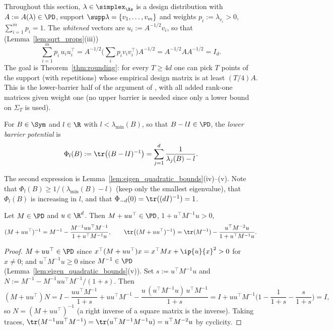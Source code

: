 Throughout this section, $\lambda \in \simplex_{\Xs}$ is a design distribution with
$A := A(\lambda) \in \PD$, support $\supp\lambda = \{v_1,\dots,v_m\}$ and weights
$p_i := \lambda_{v_i} > 0$, $\sum_{i=1}^m p_i = 1$. The \emph{whitened} vectors are
$u_i := A^{-1/2}v_i$, so that (Lemma~\ref{lem:sqrt_props}(iii))
\[
  \sum_{i=1}^m p_i\,u_iu_i^\top = A^{-1/2}\Big(\sum_i p_iv_iv_i^\top\Big)A^{-1/2} = A^{-1/2}AA^{-1/2} = I_d .
\]
The goal is Theorem~\ref{thm:rounding}: for every $T \ge 4d$ one can pick $T$ points of the
support (with repetitions) whose empirical design matrix is at least $(T/4)A$. This is the
lower-barrier half of the argument of \cite{batson2012twice}, with all added rank-one
matrices given weight one (no upper barrier is needed since only a lower bound on
$\Sigma_T$ is used).

\begin{definition}\label{def:barrier_potential}
\leanok
{}
For $B \in \Sym$ and $l \in \R$ with $l < \lambda_{\min}(B)$, so that $B - lI \in \PD$, the
\emph{lower barrier potential} is
\[
  \Phi_l(B) := \tr\big((B - lI)^{-1}\big) = \sum_{j=1}^d \frac{1}{\lambda_j(B) - l} .
\]
\end{definition}

The second expression is Lemma~\ref{lem:eigen_quadratic_bounds}(iv)--(v). Note that
$\Phi_l(B) \ge 1/(\lambda_{\min}(B) - l)$ (keep only the smallest eigenvalue), that $\Phi_l(B)$ is
increasing in $l$, and that $\Phi_{-d}(0) = \tr((dI)^{-1}) = 1$.

\begin{lemma}\label{lem:sherman_morrison_trace}
\leanok
{}
Let $M \in \PD$ and $u \in \R^d$. Then $M + uu^\top \in \PD$, $1 + u^\top M^{-1}u > 0$,
\[
  (M + uu^\top)^{-1} = M^{-1} - \frac{M^{-1}uu^\top M^{-1}}{1 + u^\top M^{-1}u},
  \qquad
  \tr\big((M + uu^\top)^{-1}\big) = \tr(M^{-1}) - \frac{u^\top M^{-2}u}{1 + u^\top M^{-1}u} .
\]
\end{lemma}

\begin{proof}
\leanok
{}
$M + uu^\top \in \PD$ since $x^\top(M+uu^\top)x = x^\top Mx + \ip{u}{x}^2 > 0$ for $x \ne 0$; and
$u^\top M^{-1}u \ge 0$ since $M^{-1} \in \PD$ (Lemma~\ref{lem:eigen_quadratic_bounds}(v)). Set
$s := u^\top M^{-1}u$ and $N := M^{-1} - M^{-1}uu^\top M^{-1}/(1+s)$. Then
\[
  (M + uu^\top)N = I - \frac{uu^\top M^{-1}}{1+s} + uu^\top M^{-1} - \frac{u\,(u^\top M^{-1}u)\,u^\top M^{-1}}{1+s}
  = I + uu^\top M^{-1}\Big(1 - \frac{1}{1+s} - \frac{s}{1+s}\Big) = I ,
\]
so $N = (M+uu^\top)^{-1}$ (a right inverse of a square matrix is the inverse). Taking traces,
$\tr(M^{-1}uu^\top M^{-1}) = \tr(u^\top M^{-1}M^{-1}u) = u^\top M^{-2}u$ by cyclicity.
\end{proof}

